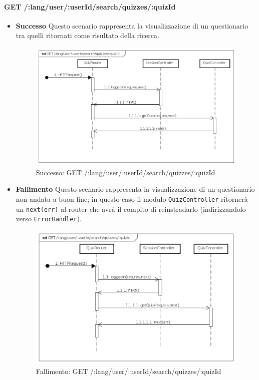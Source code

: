\paragraph{GET /:lang/user/:userId/search/quizzes/:quizId}
\begin{itemize}
\item \textbf{Successo}
Questo scenario rappresenta la visualizzazione di un questionario tra quelli ritornati come risultato della ricerca.

\begin{figure}[ht]
	\centering
	\includegraphics[scale=0.45]{UML/DiagrammiDiSequenza/Back-end/GET__lang_user__userId_search_quizzes__quizId_success.png}
	\caption{Successo: GET /:lang/user/:userId/search/quizzes/:quizId}
\end{figure}
\FloatBarrier

\item \textbf{Fallimento}
Questo scenario rappresenta la visualizzazione di un questionario non andata a buon fine; in questo caso il modulo \texttt{QuizController} ritornerà un \texttt{next(err)} al router che avrà il compito di reinstradarlo (indirizzandolo verso \texttt{ErrorHandler}).

\begin{figure}[ht]
	\centering
	\includegraphics[scale=0.45]{UML/DiagrammiDiSequenza/Back-end/GET__lang_user__userId_search_quizzes__quizId_failure.png}
	\caption{Fallimento: GET /:lang/user/:userId/search/quizzes/:quizId}
\end{figure}
\FloatBarrier

\end{itemize}

